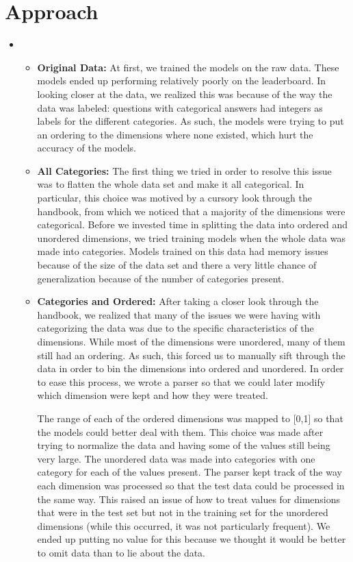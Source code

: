 \section{Approach}
\medskip
\begin{itemize}

    \item {}
    \begin{itemize}
    \item \textbf{Original Data:} At first, we trained the models on the raw data. These models ended up performing relatively poorly on the leaderboard. In looking closer at the data, we realized this was because of the way the data was labeled: questions with categorical answers had integers as labels for the different categories. As such, the models were trying to put an ordering to the dimensions where none existed, which hurt the accuracy of the models.
    \item \textbf{All Categories:} The first thing we tried in order to resolve this issue was to flatten the whole data set and make it all categorical. In particular, this choice was motived by a cursory look through the handbook, from which we noticed that a majority of the dimensions were categorical. Before we invested time in splitting the data into ordered and unordered dimensions, we tried training models when the whole data was made into categories. Models trained on this data had memory issues because of the size of the data set and there a very little chance of generalization because of the number of categories present.
    \item \textbf{Categories and Ordered:} After taking a closer look through the handbook, we realized that many of the issues we were having with categorizing the data was due to the specific characteristics of the dimensions. While most of the dimensions were unordered, many of them still had an ordering. As such, this forced us to manually sift through the data in order to bin the dimensions into ordered and unordered. In order to ease this process, we wrote a parser so that we could later modify which dimension were kept and how they were treated. 

    The range of each of the ordered dimensions was mapped to [0,1] so that the models could better deal with them. This choice was made after trying to normalize the data and having some of the values still being very large. The unordered data was made into categories with one category for each of the values present. The parser kept track of the way each dimension was processed so that the test data could be processed in the same way. This raised an issue of how to treat values for dimensions that were in the test set but not in the training set for the unordered dimensions (while this occurred, it was not particularly frequent). We ended up putting no value for this because we thought it would be better to omit data than to lie about the data. 


\end{itemize}
\end{itemize}
